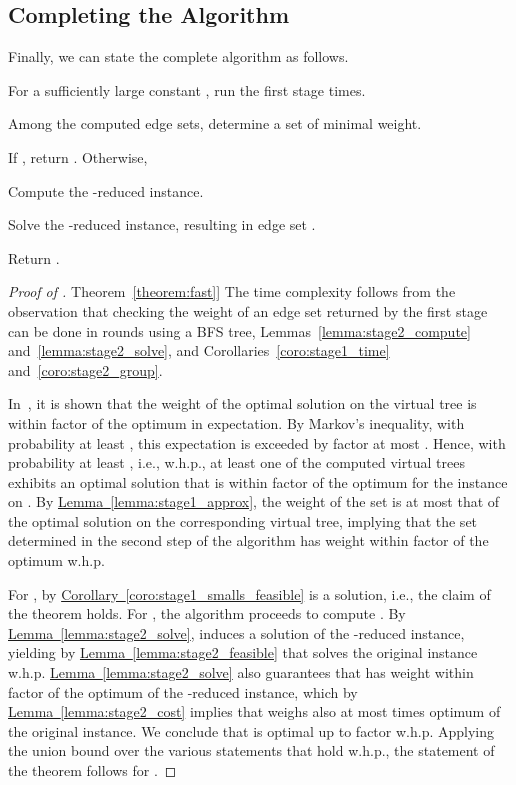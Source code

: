 \documentclass[letterpaper,11pt]{article}
\newcommand{\namedref}[2]{\hyperref[#2]{#1~\ref*{#2}}}
\newcommand{\theoremref}[1]{\namedref{Theorem}{#1}}
\newcommand{\lemmaref}[1]{\namedref{Lemma}{#1}}
\newcommand{\corollaryref}[1]{\namedref{Corollary}{#1}}
\begin{document}
\subsection{Completing the Algorithm}

Finally, we can state the complete algorithm as follows.
\begin{compactenum}
\item For a sufficiently large constant , run the first stage 
times.
\item Among the computed edge sets, determine a set  of minimal weight.
\item If , return . Otherwise,
\begin{compactenum}
\item Compute the -reduced instance.
\item Solve the -reduced instance, resulting in edge set .
\item Return .
\end{compactenum}
\end{compactenum}

\begin{proof}[Proof of \theoremref{theorem:fast}]
The time complexity follows from the observation that checking the weight of an
edge set returned by the first stage can be done in  rounds using a BFS
tree, Lemmas~\ref{lemma:stage2_compute} and~\ref{lemma:stage2_solve}, and
Corollaries~\ref{coro:stage1_time} and~\ref{coro:stage2_group}.

In~\cite{KKMPT-12}, it is shown that the weight of the optimal solution on the
virtual tree is within factor  of the optimum in expectation. By
Markov's inequality, with probability at least , this expectation is
exceeded by factor at most . Hence, with probability at least , i.e., w.h.p., at least one of the computed virtual trees exhibits an
optimal solution that is within factor  of the optimum for the
instance on . By \lemmaref{lemma:stage1_approx}, the weight of the set  is
at most that of the optimal solution on the corresponding virtual tree, implying
that the set  determined in the second step of the algorithm has weight
within factor  of the optimum w.h.p.

For , by \corollaryref{coro:stage1_smalls_feasible}  is a
solution, i.e., the claim of the theorem holds. For , the algorithm
proceeds to compute . By \lemmaref{lemma:stage2_solve},  induces a
solution of the -reduced instance, yielding by
\lemmaref{lemma:stage2_feasible} that  solves the original instance
w.h.p. \lemmaref{lemma:stage2_solve} also guarantees that  has weight within
factor  of the optimum of the -reduced instance, which by
\lemmaref{lemma:stage2_cost} implies that  weighs also at most  times optimum of the original instance. We conclude that  is
optimal up to factor  w.h.p. Applying the union bound over the
various statements that hold w.h.p., the statement of the theorem follows for
.
\end{proof}
\end{document}
